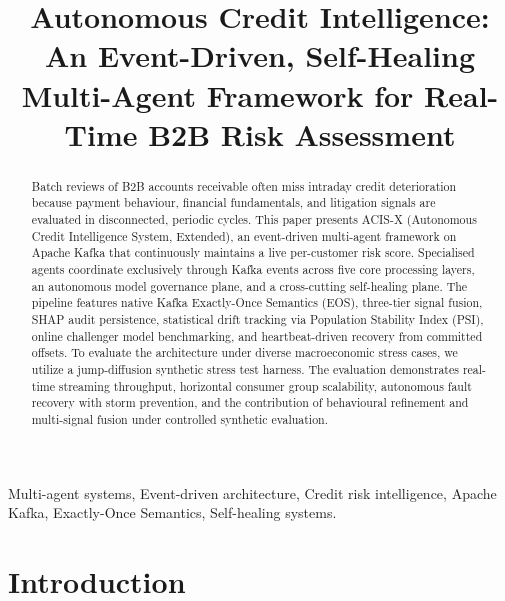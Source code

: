 \documentclass[conference]{IEEEtran}
\begin{document}
\title{Autonomous Credit Intelligence: An Event-Driven, Self-Healing Multi-Agent Framework for Real-Time B2B Risk Assessment}

\author{
}

\maketitle

\begin{abstract}
Batch reviews of B2B accounts receivable often miss intraday credit deterioration because payment behaviour, financial fundamentals, and litigation signals are evaluated in disconnected, periodic cycles. This paper presents ACIS-X (Autonomous Credit Intelligence System, Extended), an event-driven multi-agent framework on Apache Kafka that continuously maintains a live per-customer risk score. Specialised agents coordinate exclusively through Kafka events across five core processing layers, an autonomous model governance plane, and a cross-cutting self-healing plane. The pipeline features native Kafka Exactly-Once Semantics (EOS), three-tier signal fusion, SHAP audit persistence, statistical drift tracking via Population Stability Index (PSI), online challenger model benchmarking, and heartbeat-driven recovery from committed offsets. To evaluate the architecture under diverse macroeconomic stress cases, we utilize a jump-diffusion synthetic stress test harness. The evaluation demonstrates real-time streaming throughput, horizontal consumer group scalability, autonomous fault recovery with storm prevention, and the contribution of behavioural refinement and multi-signal fusion under controlled synthetic evaluation.
\end{abstract}

\begin{IEEEkeywords}
Multi-agent systems, Event-driven architecture, Credit risk intelligence, Apache Kafka, Exactly-Once Semantics, Self-healing systems.
\end{IEEEkeywords}

\section{Introduction}
\label{sec:intro}
\end{document}
